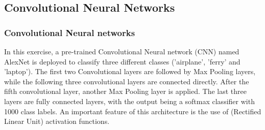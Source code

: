 \documentclass[conference,compsoc]{IEEEtran}
\begin{document}
%
%
%
%
% 
%
%
%
%
%
%


\subsection{Convolutional Neural Networks}

\subsubsection{Convolutional Neural networks}
In this exercise, a pre-trained Convolutional Neural network (CNN) named AlexNet is deployed to classify three different classes ('airplane', 'ferry' and 'laptop'). The first two Convolutional layers are followed by Max Pooling layers, while the following three convolutional layers are connected directly. After the fifth convolutional layer, another Max Pooling layer is applied. The last three layers are fully connected layers, with the output being a softmax classifier with 1000 class labels. An important feature of this architecture is the use of 
 (Rectified Linear Unit) activation functions.
\end{document}
